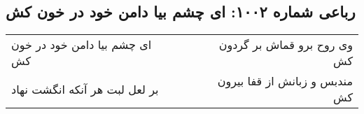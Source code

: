\begin{center}
\section*{رباعی شماره ۱۰۰۲: ای چشم بیا دامن خود در خون کش}
\label{sec:1002}
\begin{longtable}{l p{0.5cm} r}
ای چشم بیا دامن خود در خون کش
&&
وی روح برو قماش بر گردون کش
\\
بر لعل لبت هر آنکه انگشت نهاد
&&
مندبس و زبانش از قفا بیرون کش
\\
\end{longtable}
\end{center}
